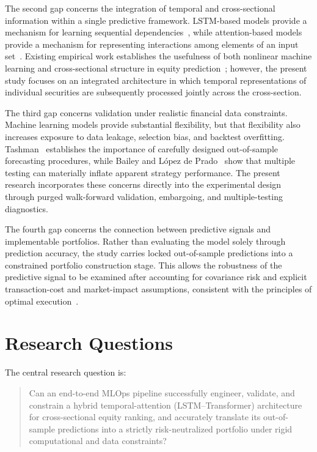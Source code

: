 \medskip

The second gap concerns the integration of temporal and cross-sectional information within a single predictive framework. LSTM-based models provide a mechanism for learning sequential dependencies~\cite{FischerKrauss2018}, while attention-based models provide a mechanism for representing interactions among elements of an input set~\cite{Vaswani2017}. Existing empirical work establishes the usefulness of both nonlinear machine learning and cross-sectional structure in equity prediction~\cite{Gu2020,Poh2021}; however, the present study focuses on an integrated architecture in which temporal representations of individual securities are subsequently processed jointly across the cross-section.

\medskip

The third gap concerns validation under realistic financial data constraints. Machine learning models provide substantial flexibility, but that flexibility also increases exposure to data leakage, selection bias, and backtest overfitting. Tashman~\cite{Tashman2000} establishes the importance of carefully designed out-of-sample forecasting procedures, while Bailey and López de Prado~\cite{BaileyLopezDePrado2014} show that multiple testing can materially inflate apparent strategy performance. The present research incorporates these concerns directly into the experimental design through purged walk-forward validation, embargoing, and multiple-testing diagnostics.

\medskip

The fourth gap concerns the connection between predictive signals and implementable portfolios. Rather than evaluating the model solely through prediction accuracy, the study carries locked out-of-sample predictions into a constrained portfolio construction stage. This allows the robustness of the predictive signal to be examined after accounting for covariance risk and explicit transaction-cost and market-impact assumptions, consistent with the principles of optimal execution~\cite{AlmgrenChriss2000}.

\section{Research Questions}
The central research question is:

\begin{quote}
    Can an end-to-end MLOps pipeline successfully engineer, validate, and constrain a hybrid temporal-attention (LSTM--Transformer) architecture for cross-sectional equity ranking, and accurately translate its out-of-sample predictions into a strictly risk-neutralized portfolio under rigid computational and data constraints?
\end{quote}

